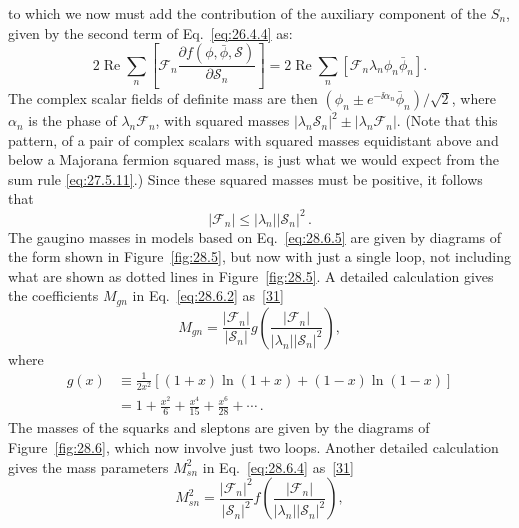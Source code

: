 to which we now must add the contribution of the auxiliary component of
the \(S_n\), given by the second term of Eq.~\eqref{eq:26.4.4} as:
\[
  2\operatorname{Re}\sum_n
  \left[
    \mathcal{F}_n
    \frac{\partial f(\phi,\bar\phi,\mathcal{S})}
         {\partial\mathcal{S}_n}
  \right]
  =2\operatorname{Re}\sum_n
  \left[\mathcal{F}_n\lambda_n\phi_n\bar\phi_n\right].
\]
The complex scalar fields of definite mass are then
\((\phi_n\pm e^{-\ii\alpha_n}\bar\phi_n)/\sqrt{2}\), where \(\alpha_n\) is
the phase of \(\lambda_n\mathcal{F}_n\), with squared masses
\(\lvert\lambda_n\mathcal{S}_n\rvert^2
\mathbin{\pm}\lvert\lambda_n\mathcal{F}_n\rvert\). (Note that this
pattern, of a pair of complex scalars with squared masses equidistant above
and below a Majorana fermion squared mass, is just what we would expect
from the sum rule \eqref{eq:27.5.11}.) Since these squared masses must be
positive, it follows that
\begin{equation}
  \lvert\mathcal{F}_n\rvert
  \leq\lvert\lambda_n\rvert\lvert\mathcal{S}_n\rvert^2\,.
  \tag{28.6.6}\label{eq:28.6.6}
\end{equation}
The gaugino masses in models based on Eq.~\eqref{eq:28.6.5} are given by
diagrams of the form shown in Figure~\ref{fig:28.5}, but now with just a
single loop, not including what are shown as dotted lines in
Figure~\ref{fig:28.5}. A detailed calculation gives the coefficients
\(M_{gn}\) in Eq.~\eqref{eq:28.6.2}
as~\hyperref[ch28-ref-31]{[31]}
\begin{equation}
  M_{gn}
  =\frac{\lvert\mathcal{F}_n\rvert}{\lvert\mathcal{S}_n\rvert}
  g\left(
    \frac{\lvert\mathcal{F}_n\rvert}
         {\lvert\lambda_n\rvert\lvert\mathcal{S}_n\rvert^2}
  \right),
  \tag{28.6.7}\label{eq:28.6.7}
\end{equation}
where
\begin{equation}
  \begin{aligned}
    g(x)
      &\equiv\frac{1}{2x^2}
      \left[(1+x)\ln(1+x)+(1-x)\ln(1-x)\right]\\
      &=1+\frac{x^2}{6}+\frac{x^4}{15}+\frac{x^6}{28}+\cdots\,.
  \end{aligned}
  \tag{28.6.8}\label{eq:28.6.8}
\end{equation}
The masses of the squarks and sleptons are given by the diagrams of
Figure~\ref{fig:28.6}, which now involve just two loops. Another detailed
calculation gives the mass parameters \(M_{sn}^2\) in
Eq.~\eqref{eq:28.6.4} as~\hyperref[ch28-ref-31]{[31]}
\begin{equation}
  M_{sn}^2
  =\frac{\lvert\mathcal{F}_n\rvert^2}
         {\lvert\mathcal{S}_n\rvert^2}
  f\left(
    \frac{\lvert\mathcal{F}_n\rvert}
         {\lvert\lambda_n\rvert\lvert\mathcal{S}_n\rvert^2}
  \right),
  \tag{28.6.9}\label{eq:28.6.9}
\end{equation}
